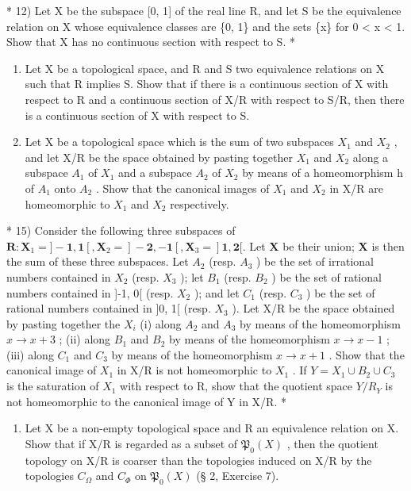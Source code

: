 * 12) Let X be the subspace {[}0, 1{]} of the real line R, and let S be the equivalence relation on X whose equivalence classes are \{0, 1\} and the sets \{x\} for 0 \textless{} x \textless{} 1. Show that X has no continuous section with respect to S. *

\begin{enumerate}
\def\labelenumi{\arabic{enumi})}
\setcounter{enumi}{12}
\item
  Let X be a topological space, and R and S two equivalence relations on X such that R implies S. Show that if there is a continuous section of X with respect to R and a continuous section of X/R with respect to S/R, then there is a continuous section of X with respect to S.
\item
  Let X be a topological space which is the sum of two subspaces \(X_{1}\) and \(X_{2}\) , and let X/R be the space obtained by pasting together \(X_{1}\) and \(X_{2}\) along a subspace \(A_{1}\) of \(X_{1}\) and a subspace \(A_{2}\) of \(X_{2}\) by means of a homeomorphism h of \(A_{1}\) onto \(A_{2}\) . Show that the canonical images of \(X_{1}\) and \(X_{2}\) in X/R are homeomorphic to \(X_{1}\) and \(X_{2}\) respectively.
\end{enumerate}

* 15) Consider the following three subspaces of \(\mathbf{R}: \mathbf{X}_1 = ] - \mathbf{1}, \mathbf{1}[, \mathbf{X}_2 = ] - \mathbf{2}, -\mathbf{1}[, \mathbf{X}_3 = ]\mathbf{1}, \mathbf{2}[.\) Let \(\mathbf{X}\) be their union; \(\mathbf{X}\) is then the sum of these three subspaces. Let \(A_{2}\) (resp. \(A_{3}\) ) be the set of irrational numbers contained in \(X_{2}\) (resp. \(X_{3}\) ); let \(B_{1}\) (resp. \(B_{2}\) ) be the set of rational numbers contained in {]}-1, 0{[} (resp. \(X_{2}\) ); and let \(C_{1}\) (resp. \(C_{3}\) ) be the set of rational numbers contained in {]}0, 1{[} (resp. \(X_{3}\) ). Let X/R be the space obtained by pasting together the \(X_{i}\) (i) along \(A_{2}\) and \(A_{3}\) by means of the homeomorphism \(x \to x + 3\) ; (ii) along \(B_{1}\) and \(B_{2}\) by means of the homeomorphism \(x \to x - 1\) ; (iii) along \(C_{1}\) and \(C_{3}\) by means of the homeomorphism \(x \to x + 1\) . Show that the canonical image of \(X_{1}\) in X/R is not homeomorphic to \(X_{1}\) . If \(Y = X_{1} \cup B_{2} \cup C_{3}\) is the saturation of \(X_{1}\) with respect to R, show that the quotient space \(Y/R_{Y}\) is not homeomorphic to the canonical image of Y in X/R. *

\begin{enumerate}
\def\labelenumi{\arabic{enumi})}
\setcounter{enumi}{15}
\tightlist
\item
  Let X be a non-empty topological space and R an equivalence relation on X. Show that if X/R is regarded as a subset of \(\mathfrak{P}_{0}(X)\) , then the quotient topology on X/R is coarser than the topologies induced on X/R by the topologies \(C_{\Omega}\) and \(C_{\Phi}\) on \(\mathfrak{P}_{0}(X)\) (§ 2, Exercise 7).
\end{enumerate}

